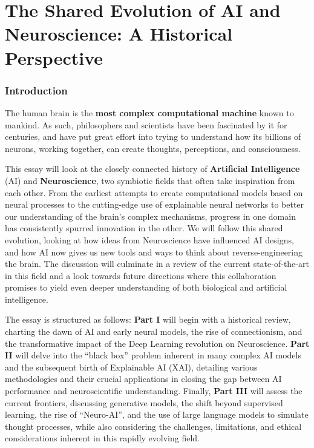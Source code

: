 \part{The Shared Evolution of AI and Neuroscience: A Historical Perspective}

\section{Introduction}

The human brain is the \textbf{most complex computational machine} known to mankind. As such, philosophers and scientists have been fascinated by it for centuries, and have put great effort into trying to understand how its billions of neurons, working together, can create thoughts, perceptions, and consciousness.

This essay will look at the closely connected history of \textbf{Artificial Intelligence} (AI) and \textbf{Neuroscience}, two symbiotic fields that often take inspiration from each other. From the earliest attempts to create computational models based on neural processes to the cutting-edge use of explainable neural networks to better our understanding of the brain's complex mechanisms, progress in one domain has consistently spurred innovation in the other. We will follow this shared evolution, looking at how ideas from Neuroscience have influenced AI designs, and how AI now gives us new tools and ways to think about reverse-engineering the brain. The discussion will culminate in a review of the current state-of-the-art in this field and a look towards future directions where this collaboration promises to yield even deeper understanding of both biological and artificial intelligence.

The essay is structured as follows: \textbf{Part I} will begin with a historical review, charting the dawn of AI and early neural models, the rise of connectionism, and the transformative impact of the Deep Learning revolution on Neuroscience. \textbf{Part II} will delve into the ``black box'' problem inherent in many complex AI models and the subsequent birth of Explainable AI (XAI), detailing various methodologies and their crucial applications in closing the gap between AI performance and neuroscientific understanding. Finally, \textbf{Part III} will assess the current frontiers, discussing generative models, the shift beyond supervised learning, the rise of ``Neuro-AI'', and the use of large language models to simulate thought processes, while also considering the challenges, limitations, and ethical considerations inherent in this rapidly evolving field.


